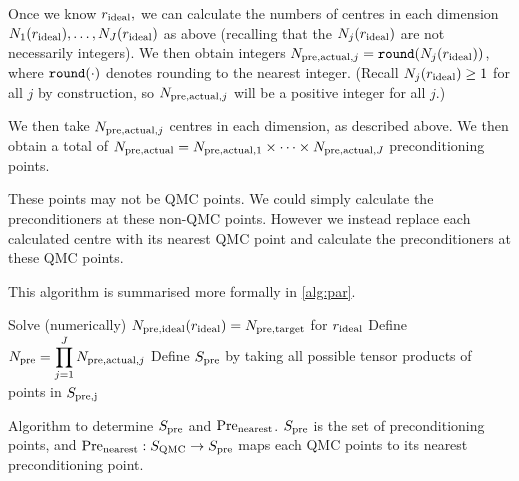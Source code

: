     Once we know $r_{\mathrm{ideal}},$ we can calculate the numbers of centres in each dimension $N_{1}(r_{\mathrm{ideal}}),\ldots,N_{J}(r_{\mathrm{ideal}})$ as above (recalling that the $N_{j}(r_{\mathrm{ideal}})$ are not necessarily integers). We then obtain integers $\Npreactualj = \round{\Nj(\rideal)}$, where $\round{\cdot}$ denotes rounding to the nearest integer. (Recall $N_{j}(r_{\mathrm{ideal}}) \geq 1$ for all $j$ by construction, so $N_{\mathrm{pre,actual},j}$ will be a positive integer for all $j.$)

We then take $N_{\mathrm{pre,actual},j}$ centres in each dimension, as described above. We then obtain a total of $N_{\mathrm{pre,actual}} = N_{\mathrm{pre,actual},1} \times \cdots \times N_{\mathrm{pre,actual},J}$ preconditioning points.

These points may not be QMC points. We could simply calculate the preconditioners at these non-QMC points. However we instead replace each calculated centre with its nearest QMC point and calculate the preconditioners at these QMC points.

    This algorithm is summarised more formally in \cref{alg:par}.
    
    



\begin{algorithm}[h]
\DontPrintSemicolon
{}

\Input{$\Npretarget \in \NN$}
\Output{$\Spre$, $\nearestpre$}
\BlankLine
Solve (numerically) $N_{\mathrm{pre,ideal}}(r_{\mathrm{ideal}}) = N_{\mathrm{pre,target}}$ for $r_{\mathrm{ideal}}$\;
Define $\displaystyle N_{\mathrm{pre}} = \prod_{j=1}^J N_{\mathrm{pre,actual},j}$\;
Define $\Spre$ by taking all possible tensor products of points in $S_{\mathrm{pre,j}}$\;
\caption{Algorithm to determine $\Spre$ and $\nearestpre$\label{alg:par}. $\Spre$ is the set of preconditioning points, and $\mathrm{Pre}_{\mathrm{nearest}}:S_{\mathrm{QMC}}\rightarrow S_{\mathrm{pre}}$ maps each QMC points to its nearest preconditioning point.}
\end{algorithm}

